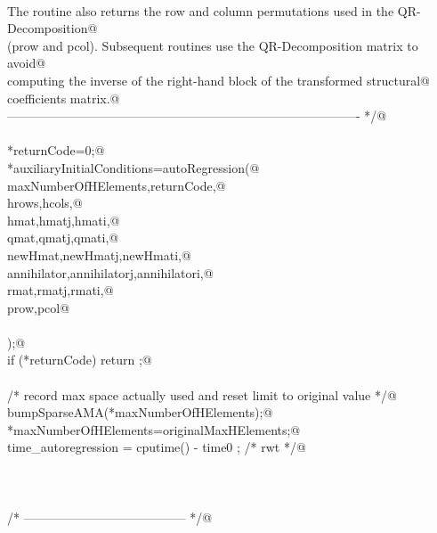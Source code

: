 \documentclass[12pt]{article}
\begin{document}
\begin{flushleft}
\begin{minipage}{\linewidth}
\begin{list}{}{}
\mbox{}\verb@@\\
\mbox{}\verb@        The routine also returns the row and column permutations used in the QR-Decomposition@\\
\mbox{}\verb@        (prow and pcol).  Subsequent routines use the QR-Decomposition matrix to avoid@\\
\mbox{}\verb@        computing the inverse of the right-hand block of the transformed structural@\\
\mbox{}\verb@        coefficients matrix.@\\
\mbox{}\verb@        ------------------------------------------------------------------------------------- */@\\
\mbox{}\verb@@\\
\mbox{}\verb@        *returnCode=0;@\\
\mbox{}\verb@        *auxiliaryInitialConditions=autoRegression(@\\
\mbox{}\verb@                maxNumberOfHElements,returnCode,@\\
\mbox{}\verb@        hrows,hcols,@\\
\mbox{}\verb@        hmat,hmatj,hmati,@\\
\mbox{}\verb@        qmat,qmatj,qmati,@\\
\mbox{}\verb@        newHmat,newHmatj,newHmati,@\\
\mbox{}\verb@        annihilator,annihilatorj,annihilatori,@\\
\mbox{}\verb@        rmat,rmatj,rmati,@\\
\mbox{}\verb@        prow,pcol@\\
\mbox{}\verb@@\\
\mbox{}\verb@        );@\\
\mbox{}\verb@        if (*returnCode) return ;@\\
\mbox{}\verb@@\\
\mbox{}\verb@        /* record max space actually used and reset limit to original value */@\\
\mbox{}\verb@        bumpSparseAMA(*maxNumberOfHElements);@\\
\mbox{}\verb@        *maxNumberOfHElements=originalMaxHElements;@\\
\mbox{}\verb@        time_autoregression = cputime() - time0 ; /* rwt */@\\
\mbox{}\verb@@\\
\mbox{}\verb@@\\
\mbox{}\verb@@\\
\mbox{}\verb@        /* --------------------------------------- */@\\

\end{list}
\end{minipage}
\end{flushleft}
\end{document}
